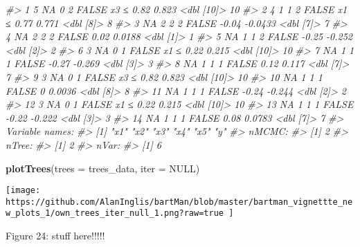 \documentclass[
]{article}
\newenvironment{Shaded}{\begin{snugshade}}{\end{snugshade}}
\newcommand{\AttributeTok}[1]{\textcolor[rgb]{0.13,0.29,0.53}{#1}}
\newcommand{\CommentTok}[1]{\textcolor[rgb]{0.56,0.35,0.01}{\textit{#1}}}
\newcommand{\ConstantTok}[1]{\textcolor[rgb]{0.56,0.35,0.01}{#1}}
\newcommand{\FunctionTok}[1]{\textcolor[rgb]{0.13,0.29,0.53}{\textbf{#1}}}
\newcommand{\NormalTok}[1]{#1}
\begin{document}
\begin{Shaded}
\begin{Highlighting}[]
\CommentTok{\#\textgreater{}  1          5     NA     0        2 FALSE   x3  ≤  0.82  0.823  \textless{}dbl [10]\textgreater{}    10}
\CommentTok{\#\textgreater{}  2          4      1     1        2 FALSE   x1  ≤  0.77  0.771  \textless{}dbl [8]\textgreater{}      8}
\CommentTok{\#\textgreater{}  3         NA      2     2        2 FALSE   {-}0.04       {-}0.0433 \textless{}dbl [7]\textgreater{}      7}
\CommentTok{\#\textgreater{}  4         NA      2     2        2 FALSE   0.02         0.0188 \textless{}dbl [1]\textgreater{}      1}
\CommentTok{\#\textgreater{}  5         NA      1     1        2 FALSE   {-}0.25       {-}0.252  \textless{}dbl [2]\textgreater{}      2}
\CommentTok{\#\textgreater{}  6          3     NA     0        1 FALSE   x1  ≤  0.22  0.215  \textless{}dbl [10]\textgreater{}    10}
\CommentTok{\#\textgreater{}  7         NA      1     1        1 FALSE   {-}0.27       {-}0.269  \textless{}dbl [3]\textgreater{}      3}
\CommentTok{\#\textgreater{}  8         NA      1     1        1 FALSE   0.12         0.117  \textless{}dbl [7]\textgreater{}      7}
\CommentTok{\#\textgreater{}  9          3     NA     0        1 FALSE   x3  ≤  0.82  0.823  \textless{}dbl [10]\textgreater{}    10}
\CommentTok{\#\textgreater{} 10         NA      1     1        1 FALSE   0            0.0036 \textless{}dbl [8]\textgreater{}      8}
\CommentTok{\#\textgreater{} 11         NA      1     1        1 FALSE   {-}0.24       {-}0.244  \textless{}dbl [2]\textgreater{}      2}
\CommentTok{\#\textgreater{} 12          3     NA     0        1 FALSE   x1  ≤  0.22  0.215  \textless{}dbl [10]\textgreater{}    10}
\CommentTok{\#\textgreater{} 13         NA      1     1        1 FALSE   {-}0.22       {-}0.222  \textless{}dbl [3]\textgreater{}      3}
\CommentTok{\#\textgreater{} 14         NA      1     1        1 FALSE   0.08         0.0783 \textless{}dbl [7]\textgreater{}      7}
\CommentTok{\#\textgreater{} Variable names:}
\CommentTok{\#\textgreater{} [1] "x1" "x2" "x3" "x4" "x5" "y" }
\CommentTok{\#\textgreater{} nMCMC:}
\CommentTok{\#\textgreater{} [1] 2}
\CommentTok{\#\textgreater{} nTree:}
\CommentTok{\#\textgreater{} [1] 2}
\CommentTok{\#\textgreater{} nVar:}
\CommentTok{\#\textgreater{} [1] 6}
\end{Highlighting}
\end{Shaded}

\begin{Shaded}
\begin{Highlighting}[]
\FunctionTok{plotTrees}\NormalTok{(}\AttributeTok{trees =}\NormalTok{ trees\_data, }\AttributeTok{iter =} \ConstantTok{NULL}\NormalTok{)}
\end{Highlighting}
\end{Shaded}

\begin{center}\texttt{[image: https://github.com/AlanInglis/bartMan/blob/master/bartman\_vignettte\_new\_plots\_1/own\_trees\_iter\_null\_1.png?raw=true
]} \end{center}

\protect\hypertarget{fig24:fig24}{}{Figure 24: }stuff here!!!!!
\end{document}

